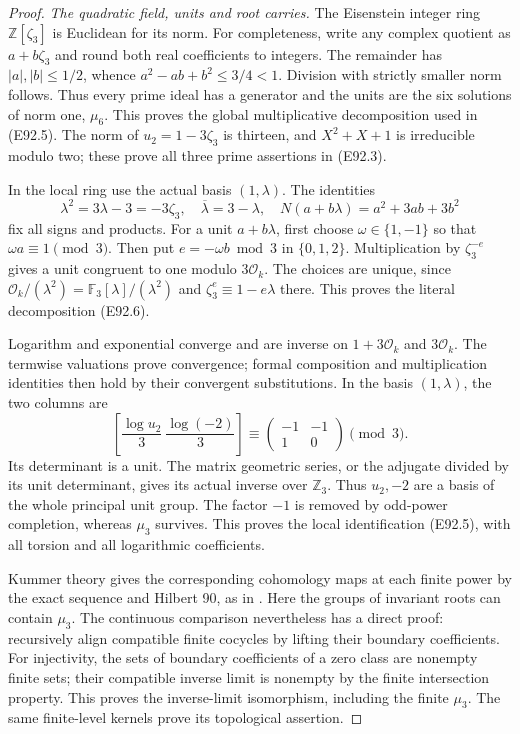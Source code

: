 \begin{proof}
\emph{The quadratic field, units and root carries.}
The Eisenstein integer ring $\mathbb Z[\zeta_3]$
is Euclidean for its norm. For completeness,
write any complex quotient as $a+b\zeta_3$
and round both real coefficients to integers.
The remainder has $|a|,|b|\le1/2$, whence
$a^2-ab+b^2\le3/4<1$. Division with strictly
smaller norm follows. Thus every prime ideal
has a generator and the units are the six
solutions of norm one, $\mu_6$. This proves
the global multiplicative decomposition used
in (E92.5). The norm of $u_2=1-3\zeta_3$
is thirteen, and $X^2+X+1$ is irreducible
modulo two; these prove all three prime
assertions in (E92.3).

In the local ring use the actual basis $(1,\lambda)$.
The identities
\[
 \lambda^2=3\lambda-3=-3\zeta_3,
 \quad \overline\lambda=3-\lambda,
 \quad N(a+b\lambda)=a^2+3ab+3b^2
 \tag{E92.19}
\]
fix all signs and products. For a unit
$a+b\lambda$, first choose $\omega\in\{1,-1\}$
so that $\omega a\equiv1\pmod3$.
Then put $e=-\omega b\bmod3$ in $\{0,1,2\}$.
Multiplication by $\zeta_3^{-e}$ gives a unit
congruent to one modulo $3\mathcal O_k$.
The choices are unique, since
$\mathcal O_k/(\lambda^2)=\mathbb F_3[\lambda]/(\lambda^2)$
and $\zeta_3^e\equiv1-e\lambda$ there.
This proves the literal decomposition (E92.6).

Logarithm and exponential converge and are inverse
on $1+3\mathcal O_k$ and $3\mathcal O_k$.
The termwise valuations prove convergence;
formal composition and multiplication identities
then hold by their convergent substitutions.
In the basis $(1,\lambda)$, the two columns are
\[
 \left[\frac{\log u_2}{3}\ \frac{\log(-2)}3\right]
       \equiv\begin{pmatrix}-1&-1\\1&0\end{pmatrix}\pmod3.
 \tag{E92.20}
\]
Its determinant is a unit. The matrix geometric
series, or the adjugate divided by its unit
determinant, gives its actual inverse over
$\mathbb Z_3$. Thus $u_2,-2$ are a basis
of the whole principal unit group. The factor
$-1$ is removed by odd-power completion,
whereas $\mu_3$ survives. This proves the
local identification (E92.5), with all
torsion and all logarithmic coefficients.

Kummer theory gives the corresponding cohomology
maps at each finite power by the exact sequence
and Hilbert 90, as in
\cite[II, Proposition1.22; III, \S4, Step2]{E_MilneCFT}.
Here the groups of invariant roots can contain
$\mu_3$. The continuous comparison nevertheless
has a direct proof: recursively align compatible
finite cocycles by lifting their boundary
coefficients. For injectivity, the sets of
boundary coefficients of a zero class are
nonempty finite sets; their compatible inverse
limit is nonempty by the finite intersection
property. This proves the inverse-limit
isomorphism, including the finite $\mu_3$.
The same finite-level kernels prove its
topological assertion.


\end{proof}
